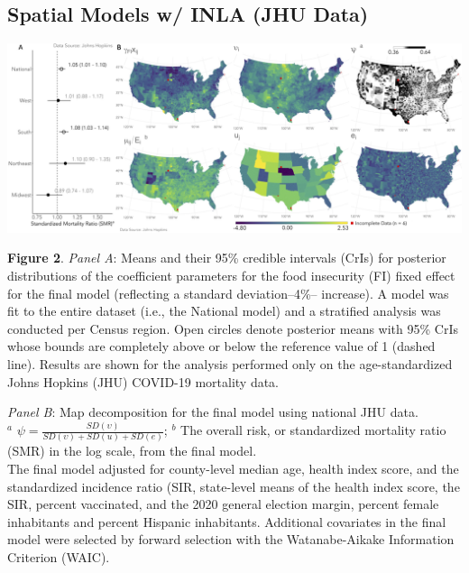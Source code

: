 \documentclass{beamer}
\begin{document}
 \subsection{Spatial Models w/ INLA (JHU Data)}
\begin{frame}
	
	
	
	\vspace*{-0.04 cm}
	\hspace*{-0.45 cm}
	\includegraphics[scale=0.152]{images-logos/combo-forest-map-decomp-jhu.png}
	
	\raggedright
	\tiny{\textbf{Figure 2}. \textit{Panel A}: Means and their 95\% credible intervals (CrIs) for posterior distributions of the coefficient parameters for the food insecurity (FI) fixed effect for the final model (reflecting a standard deviation--4\%-- increase). A model was fit to the entire dataset (i.e., the National model) and a stratified analysis was conducted per Census region. Open circles denote posterior means with 95\% CrIs whose bounds are completely above or below the reference value of 1 (dashed line). Results are shown for the analysis performed only on the age-standardized Johns Hopkins (JHU) COVID-19 mortality data. 
		
		\vspace{0.25cm}
		
		\textit{Panel B}: Map decomposition for the final model using national JHU data.\\
		$^a$ $\psi=\frac{SD(\upsilon)}{SD(\upsilon)+SD(u)+SD(e)}$;
		$^b$ The overall risk, or standardized mortality ratio (SMR) in the log scale, from the final model.\\
		The final model adjusted for county-level median age, health index score, and the standardized incidence ratio (SIR, state-level means of the health index score, the SIR, percent vaccinated, and the 2020 general election margin, percent female inhabitants and percent Hispanic inhabitants. Additional covariates in the final model were selected by forward selection with the Watanabe-Aikake Information Criterion (WAIC).}
	
	
\end{frame}
\end{document}

